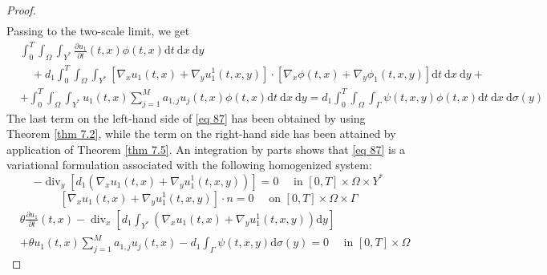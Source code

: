 \begin{proof}
\begin{equation}
\begin{aligned}
\end{aligned}
\label{eq 86}\end{equation}
Passing to the two-scale limit, we get
\begin{equation}
\begin{aligned}
&\int_{0}^{T} \int_{\Omega} \int_{Y^{*}} \frac{\partial u_{1}}{\partial t}(t, x) \phi(t, x) \mathrm{d} t \mathrm{~d} x \mathrm{~d} y \\
&\quad+d_{1} \int_{0}^{T} \int_{\Omega} \int_{Y^{*}}\left[\nabla_{x} u_{1}(t, x)+\nabla_{y} u_{1}^{1}(t, x, y)\right] \cdot\left[\nabla_{x} \phi(t, x)+\nabla_{y} \phi_{1}(t, x, y)\right] \mathrm{d} t \mathrm{~d} x \mathrm{~d} y+\\&+\int_{0}^{T} \int_{\Omega} \int_{Y^{*}} u_{1}(t, x) \sum_{j=1}^{M} a_{1, j} u_{j}(t, x) \phi(t, x) \mathrm{d} t \mathrm{~d} x \mathrm{~d} y= d_{1} \int_{0}^{T} \int_{\Omega} \int_{\Gamma} \psi(t, x, y) \phi(t, x) \mathrm{d} t \mathrm{~d} x \mathrm{~d} \sigma(y)
\end{aligned}
\label{eq 87}\end{equation}
The last term on the left-hand side of \eqref{eq 87} has been obtained by using Theorem \eqref{thm 7.2}, while the term on the right-hand side has been attained by application of Theorem \eqref{thm 7.5}. An integration by parts shows that \eqref{eq 87} is a variational formulation associated with the following homogenized system:
\begin{equation}
  -\operatorname{div}_{y}\left[d_{1}\left(\nabla_{x} u_{1}(t, x)+\nabla_{y} u_{1}^{1}(t, x, y)\right)\right]=0 \quad \text { in }[0, T] \times \Omega \times Y^{*} 
\label{eq 88}\end{equation}
\begin{equation}
 {\left[\nabla_{x} u_{1}(t, x)+\nabla_{y} u_{1}^{1}(t, x, y)\right] \cdot n=0 \quad \text { on }[0, T] \times \Omega \times \Gamma}
\label{eq 89}\end{equation}
\begin{equation}
\begin{aligned}
&\theta \frac{\partial u_{1}}{\partial t}(t, x)-\operatorname{div}_{x}\left[d_{1} \int_{Y^{*}}\left(\nabla_{x} u_{1}(t, x)+\nabla_{y} u_{1}^{1}(t, x, y)\right) \mathrm{d} y\right] \\&+\theta u_{1}(t, x) \sum_{j=1}^{M} a_{1, j} u_{j}(t, x)-d_{1} \int_{\Gamma} \psi(t, x, y) \mathrm{d} \sigma(y)=0 \quad \text { in }[0, T] \times \Omega
\end{aligned}
\label{eq 90}\end{equation}


\end{proof}
